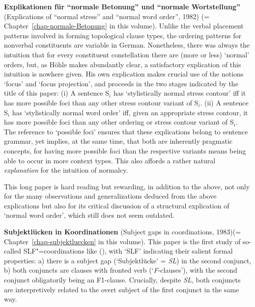 \begin{refsection}
\textbf{Explikationen für "`normale Betonung"' und "`normale Wortstellung"'}
(Explications of ``normal stress'' and ``normal word order'', 1982) (=
Chapter~\ref{chap-normale-Betonung} in this volume). Unlike the verbal placement patterns involved
in forming topological clause types, the ordering patterns for nonverbal constituents are variable
in German. Nonetheless, there was always the intuition that for every constituent constellation
there are (more or less) `normal' orders, but, as Höhle makes abundantly clear, a satisfactory explication of this intuition is nowhere given. His own explication makes crucial use of the notions `focus' and `focus projection', and proceeds in the two stages indicated by the title of this paper: (i) A sentence S$_i$ has `stylistically normal stress contour' iff it has more possible foci than any other stress contour variant of S$_i$. (ii) A sentence S$_i$ has `stylistically normal word order' iff, given an appropriate stress contour, it has more possible foci than any other ordering or stress contour variant of S$_i$. The reference to `possible foci' ensures that these explications belong to sentence grammar, yet implies, at the same time, that both are inherently pragmatic concepts, for having more possible foci than the respective variants means being able to occur in more context types. This also affords a rather natural \emph{explanation} for the intuition of normalcy. 

This long paper is hard reading but rewarding, in addition to the above, not only for the many observations and generalizations deduced from the above explications but also for its critical discussion of a structural explication of `normal word order', which still does not seem outdated.  

\textbf{Subjektlücken in Koordinationen} (Subject gaps in coordinations, 1983)\linebreak (= Chapter~\ref{chap-subjektluecken} in this volume). This paper is the first study of so-called SLF"=coordinations like (), with `SLF' indicating their salient formal properties: a) there is a subject gap (`Subjektlücke' = \emph{SL}) in the second conjunct, b) both conjuncts are clauses with fronted verb (`\emph{F}-clauses'), with the second conjunct obligatorily being an F1-clause. Crucially, despite \emph{SL}, both conjuncts are inter­pretively related to the overt subject of the first conjunct in the same way. 




\end{refsection}
